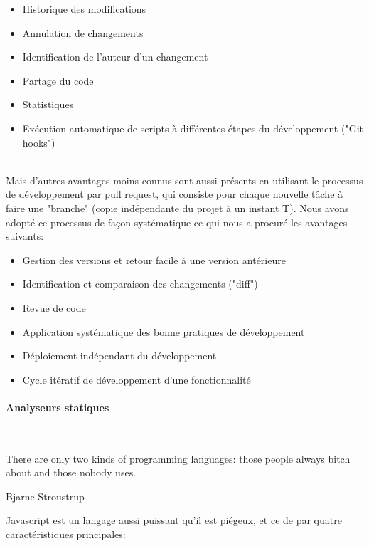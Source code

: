 \documentclass[a4paper,french,12pt]{article}
\begin{document}
	    \begin{itemize}
	    	\item Historique des modifications
	    	\item Annulation de changements
	    	\item Identification de l'auteur d'un changement
	    	\item Partage du code
	    	\item Statistiques
	    	\item Exécution automatique de scripts à différentes étapes du développement ("Git hooks")
	    \end{itemize}~\\
	    
 Mais d'autres avantages moins connus sont aussi présents en utilisant le processus de développement par pull request, qui consiste pour chaque nouvelle tâche à faire une "branche" (copie indépendante du projet à un instant T). Nous avons adopté ce processus de façon systématique ce qui nous a procuré les avantages suivants:~\\
 
 	\begin{itemize}
 		\item Gestion des versions et retour facile à une version antérieure
 		\item Identification et comparaison des changements ("diff")
 		\item Revue de code
 		\item Application systématique des bonne pratiques de développement
 		\item Déploiement indépendant du développement
 		\item Cycle itératif de développement d'une fonctionnalité
 	\end{itemize}
 	
	\paragraph{Analyseurs statiques}~\\	
	\epigraph{There are only two kinds of programming languages: those people always bitch about and those nobody uses.}{Bjarne Stroustrup}
	
		Javascript est un langage aussi puissant qu'il est piégeux, et ce de par quatre caractéristiques principales:~\\
		
\end{document}
